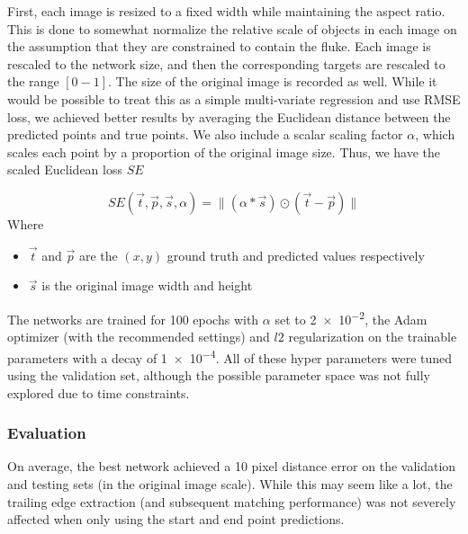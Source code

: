 First, each image is resized to a fixed width while maintaining the aspect ratio.
This is done to somewhat normalize the relative scale of objects in each image on the assumption that they are constrained to contain the fluke.
Each image is rescaled to the network size, and then the corresponding targets are rescaled to the range $[0-1]$.
The size of the original image is recorded as well.
While it would be possible to treat this as a simple multi-variate regression and use RMSE loss, we achieved better results by averaging the Euclidean distance between the predicted points and true points.
We also include a scalar scaling factor $\alpha$, which scales each point by a proportion of the original image size.
Thus, we have the scaled Euclidean loss $SE$

\begin{equation}
SE(\vec{t}, \vec{p}, \vec{s}, \alpha) = \lVert (\alpha * \vec{s}) \odot (\vec{t} - \vec{p}) \rVert
\end{equation}
Where
\begin{itemize}
    \item $\vec{t}$ and $\vec{p}$ are the $(x, y)$ ground truth and predicted values respectively
    \item $\vec{s}$ is the original image width and height
\end{itemize}

The networks are trained for 100 epochs with $\alpha$ set to \num{2e-2}, the Adam optimizer\cite{kingma2014adam} (with the recommended settings) and $l2$ regularization on the trainable parameters with a decay of \num{1e-4}.
All of these hyper parameters were tuned using the validation set, although the possible parameter space was not fully explored due to time constraints.

\subsubsection{Evaluation} %


On average, the best network achieved a 10 pixel distance error on the validation and testing sets (in the original image scale).
While this may seem like a lot, the trailing edge extraction (and subsequent matching performance) was not severely affected when only using the start and end point predictions.

